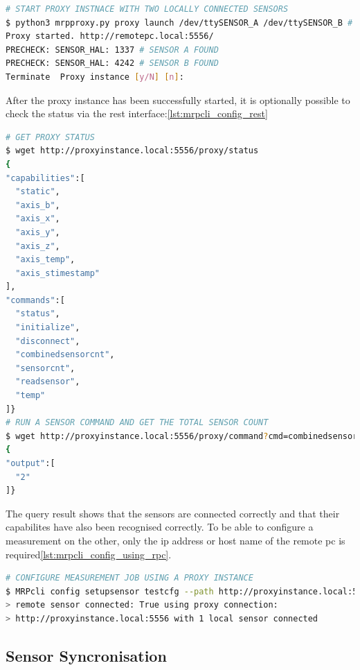 \begin{lstlisting}[language=bash, caption={MRPproxy usage to enable local sensor usage over network}, label=lst:mrpcli_proxy_start]
# START PROXY INSTNACE WITH TWO LOCALLY CONNECTED SENSORS
$ python3 mrpproxy.py proxy launch /dev/ttySENSOR_A /dev/ttySENSOR_B # add another proxy instance http://proxyinstance_2.local for multi-sensor, multi-proxy chain
Proxy started. http://remotepc.local:5556/
PRECHECK: SENSOR_HAL: 1337 # SENSOR A FOUND
PRECHECK: SENSOR_HAL: 4242 # SENSOR B FOUND
Terminate  Proxy instance [y/N] [n]: 
\end{lstlisting}

After the proxy instance has been successfully started, it is optionally
possible to check the status via the \gls{rest}
interface:\ref{lst:mrpcli_config_rest}

\begin{lstlisting}[language=bash, caption={MRPproxy REST enpoiint query examples}, label=lst:mrpcli_config_rest]
# GET PROXY STATUS
$ wget http://proxyinstance.local:5556/proxy/status
{
"capabilities":[
  "static",
  "axis_b",
  "axis_x",
  "axis_y",
  "axis_z",
  "axis_temp",
  "axis_stimestamp"
],
"commands":[
  "status",
  "initialize",
  "disconnect",
  "combinedsensorcnt",
  "sensorcnt",
  "readsensor",
  "temp"
]}
# RUN A SENSOR COMMAND AND GET THE TOTAL SENSOR COUNT
$ wget http://proxyinstance.local:5556/proxy/command?cmd=combinedsensorcnt
{
"output":[
  "2"
]}
\end{lstlisting}

The query result shows that the sensors are connected correctly and that
their capabilites have also been recognised correctly. To be able to
configure a measurement on the other, only the \gls{ip} address or host
name of the remote \gls{pc} is
required\ref{lst:mrpcli_config_using_rpc}.

\begin{lstlisting}[language=bash, caption={MRPcli usage example to connect with a network sensor}, label=lst:mrpcli_config_using_rpc]
# CONFIGURE MEASUREMENT JOB USING A PROXY INSTANCE
$ MRPcli config setupsensor testcfg --path http://proxyinstance.local:5556
> remote sensor connected: True using proxy connection:
> http://proxyinstance.local:5556 with 1 local sensor connected
\end{lstlisting}

\hypertarget{sensor-syncronisation}{%
\subsection{Sensor Syncronisation}\label{sensor-syncronisation}}

